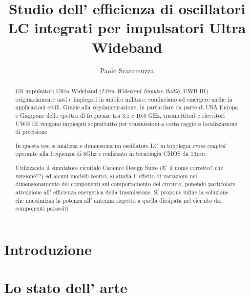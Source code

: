 \documentclass[a4paper]{memoir}
\author{Paolo Scaramuzza}
\title{Studio dell' efficienza di oscillatori LC integrati per impulsatori 
	Ultra Wideband}
\date{} %
\begin{document}
\cleardoublepage{}
\newpage

\begin{vplace}[0.7]
\begin{abstract} %
Gli impulsatori Ultra-Wideband (\emph{Ultra-Wideband Impulse-Radio}, UWB IR)
originariamente nati e impiegati in ambito militare, cominciano ad emergere
anche in applicazioni civili.
Grazie alla regolamentazione, in particolare da parte di USA Europa e Giappone 
dello spettro di frequenze tra 3.1 e 10.6 GHz, trasmettitori e ricevitori UWB
IR vengono impiegati soprattutto per trasmissioni a corto raggio e
localizzazione di precisione.

In questa tesi si analizza e dimensiona un oscillatore LC in topologia
\emph{cross-coupled} operante alla frequenza di 8Ghz e realizzato in tecnologia
CMOS da $13 \mu m$.

Utilizzando il simulatore cicuitale Cadence Design Suite (E' il nome corretto?
che versione??) ed alcuni modelli teorici, si studia l' effetto di variazioni
nel dimensionamento dei componenti sul comportamento del circuito, ponendo
particolare attenzione all' efficienza energetica della trasmissione.
Si propone infine la soluzione che massimizza la potenza all' antenna
rispetto a quella dissipata nel cicruito dai componenti parassiti.
\end{abstract}
\end{vplace}

\cleardoublepage{}
\newpage
\tableofcontents

\cleardoublepage{}
\chapter{Introduzione}

\cleardoublepage{}
\chapter{Lo stato dell' arte}

\cleardoublepage{}
\end{document}
